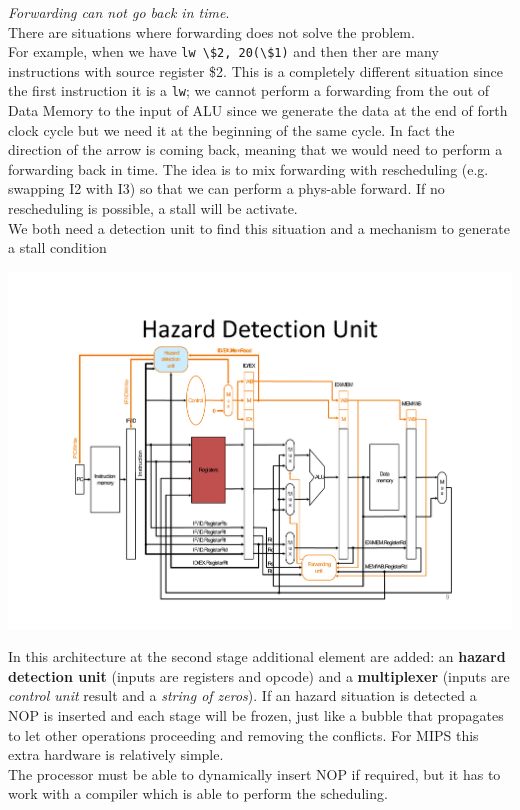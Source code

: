 \textit{Forwarding can not go back in time}.\\
There are situations where forwarding does not solve the problem.\\ For example,
when we have \verb|lw \$2, 20(\$1)| and then ther are many instructions with
source register \$2. This is a completely different situation since the first
instruction it is a \verb|lw|; we cannot perform a forwarding from the out of
Data Memory to the input of ALU since we generate the data at the end of forth
clock cycle but we need it at the beginning of the same cycle.  In fact the
direction of the arrow is coming back, meaning that we would need to perform a
forwarding back in time.  The idea is to mix forwarding with rescheduling (e.g.
swapping I2 with I3) so that we can perform a phys-able forward. If no
rescheduling is possible, a stall will be activate.\\
We both need a detection unit to find this situation and a mechanism to
generate a stall condition

\begin{center}
  \includegraphics[width=1.0\linewidth]{img/img3/mips7}
\end{center}

In this architecture at the second stage additional element are added: an
\textbf{hazard detection unit} (inputs are registers and opcode) and a
\textbf{multiplexer} (inputs are \textit{control unit} result and a
\textit{string of zeros}). If an hazard situation is detected a NOP is inserted
and each stage will be frozen, just like a bubble that propagates to let other
operations proceeding and removing the conflicts. For MIPS this extra hardware
is relatively simple.\\
The processor must be able to dynamically insert NOP if required, but it has
to work with a compiler which is able to perform the scheduling.

